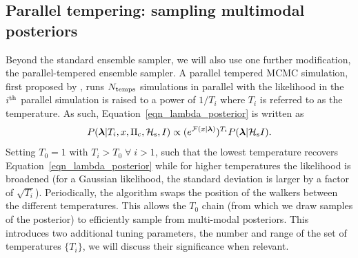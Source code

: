\documentclass[aps, prd, twocolumn, superscriptaddress, floatfix, showpacs, nofootinbib, longbibliography]{revtex4-1}
\begin{document}
\subsection{Parallel tempering: sampling multimodal posteriors}
Beyond the standard ensemble sampler, we will also use one further
modification, the parallel-tempered ensemble sampler. A parallel
tempered MCMC simulation, first proposed by \citet{swendsen1986}, runs
$N_{\rm temps}$ simulations in parallel with the likelihood in the $i^{\rm th}$
parallel simulation is raised to a power of $1/T_{i}$ where $T_i$ is referred
to as the temperature. As such, Equation~\eqref{eqn_lambda_posterior} is
written as
\begin{equation}
P(\boldsymbol{\mathbf{\lambda}} | T_i, x, \Pi_{\rm c}, \mathcal{H}_{\rm s}, I)
\propto (e^{{\mathcal{F}}(x| \boldsymbol{\mathbf{\lambda}})})^{T_i} P(\boldsymbol{\mathbf{\lambda}}| \mathcal{H}_{\rm s} I).
\end{equation}
Setting $T_0=1$ with $T_i > T_0 \; \forall \; i > 1$, such that the lowest
temperature recovers Equation~\eqref{eqn_lambda_posterior} while for higher
temperatures the likelihood is broadened (for a Gaussian likelihood, the
standard deviation is larger by a factor of $\sqrt{T_i}$). Periodically, the
algorithm swaps the position of the walkers between the different
temperatures. This allows the $T_0$ chain (from which we draw samples of the
posterior) to efficiently sample from multi-modal posteriors. This introduces
two additional tuning parameters, the number and range of the set of
temperatures $\{T_i\}$, we will discuss their significance when relevant.
\end{document}
